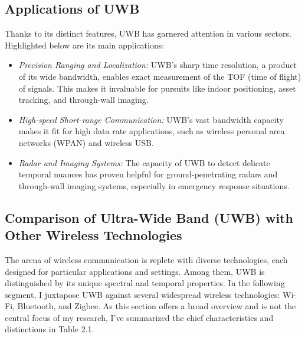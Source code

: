 \subsection{Applications of UWB}
\label{UWB_applications}
Thanks to its distinct features, UWB has garnered attention in various sectors. Highlighted below are its main applications:
\begin{itemize}
    \item \textit{Precision Ranging and Localization:} UWB's sharp time resolution, a product of its wide bandwidth, enables exact measurement of the TOF (time of flight) of signals. This makes it invaluable for pursuits like indoor positioning, asset tracking, and through-wall imaging\cite{paper_UWB_characteristics}.
    \item \textit{High-speed Short-range Communication:} UWB's vast bandwidth capacity makes it fit for high data rate applications, such as wireless personal area networks (WPAN) and wireless USB\cite{paper_UWB_characteristics}.
    \item \textit{Radar and Imaging Systems:} The capacity of UWB to detect delicate temporal nuances has proven helpful for ground-penetrating radars and through-wall imaging systems, especially in emergency response situations\cite{paper_UWB_characteristics}.

\end{itemize}

\subsection{Comparison of Ultra-Wide Band (UWB) with Other Wireless Technologies}
\label{UWB_comparison}
The arena of wireless communication is replete with diverse technologies, each designed for particular applications and settings. Among them, UWB is distinguished by its unique spectral and temporal properties. In the following segment, I juxtapose UWB against several widespread wireless technologies: Wi-Fi, Bluetooth, and Zigbee. As this section offers a broad overview and is not the central focus of my research, I've summarized the chief characteristics and distinctions in Table 2.1\cite{comparison_paper}\cite{comparison_uwb_wikipedia}.


